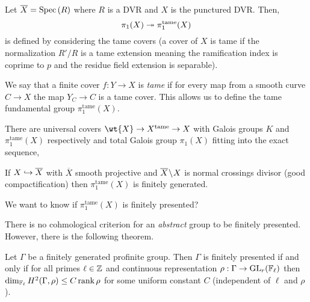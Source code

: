 \documentclass[12pt]{article}
\begin{document}
\newcommand{\tame}{\mathrm{tame}}

\begin{defn}
Let $\overline{X} = \mathrm{Spec}\left( R \right)$ where $R$ is a DVR and $X$ is the punctured DVR. Then,
\[ \pi_1(X) \onto \pi_1^{\tame}(X) \]
is defined by considering the tame covers (a cover of $X$ is tame if the normalization $R' / R$ is a tame extension meaning the ramification index is coprime to $p$ and the residue field extension is separable). 
\end{defn}

\begin{defn}
We say that a finite \etale cover $f : Y \to X$ is \textit{tame} if for every map from a smooth curve $C \to X$ the map $Y_C \to C$ is a tame \etale cover. This allows us to define the tame fundamental group $\pi_1^{\tame}(X)$. 
\end{defn}

\begin{rmk}
There are universal covers $\wt{X} \to X^{\tame} \to X$ with Galois groups $K$ and $\pi_1^\tame(X)$ respectively and total Galois group $\pi_1(X)$ fitting into the exact sequence,
\begin{center}
\end{center}
\end{rmk}

\begin{lemma}
If $X \hookrightarrow \overline{X}$ with $\overline{X}$ smooth projective and $\overline{X} \! \setminus \! X$ is normal crossings divisor (good compactification) then $\pi_1^{\tame}(X)$ is finitely generated.
\end{lemma}

\begin{rmk}
We want to know if $\pi_1^{\tame}(X)$ is finitely presented? 
\end{rmk}

\begin{rmk}
There is no cohmological criterion for an \textit{abstract} group to be finitely presented. However, there is the following theorem.
\end{rmk}

\begin{theorem}[Zebotzky]
Let $\Gamma$ be a finitely generated profinite group. Then $\Gamma$ is finitely presented if and only if for all primes $\ell \in \mathbb{Z}$ and continuous representation $\rho : \Gamma \to \mathrm{GL}_r(\mathbb{F}_\ell)$ then $\dim_{\mathbb{F}_\ell} H^2(\Gamma, \rho) \le C \operatorname{\mathrm{rank}}{\rho}$ for some uniform constant $C$ (independent of $\ell$ and $\rho$). 
\end{theorem}
\end{document}
